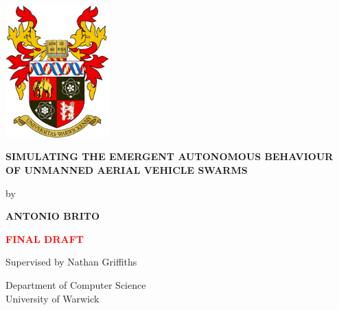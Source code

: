 \documentclass[12pt]{article}
\begin{document}
\begin{titlepage}
    \centering
    \vspace*{1cm}

    
    
    \includegraphics[width=0.3\textwidth]{crest}

    \vspace{1.5cm}
    \Large
    \textbf{SIMULATING THE EMERGENT AUTONOMOUS BEHAVIOUR OF UNMANNED AERIAL VEHICLE SWARMS}

    \vspace{1cm}

    by

    \vspace{1cm}
    
    \textbf{ANTONIO BRITO}
    
    \vfill
    \Huge
    \textcolor{red}{\textbf{FINAL DRAFT}}

    \vfill
    \Large
    Supervised by Nathan Griffiths
    
    
    \vspace{1.5cm}
    
    \Large
    Department of Computer Science\\
    University of Warwick\\
    \the\year
    
\end{titlepage}
\tableofcontents
\newpage
\end{document}
